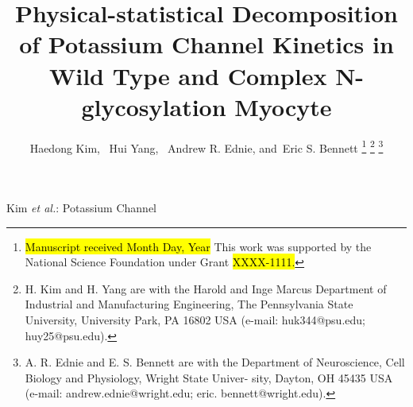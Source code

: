 \documentclass[journal]{IEEEtran}
\begin{document}
    \title{Physical-statistical Decomposition of Potassium Channel Kinetics in Wild Type and Complex N-glycosylation Myocyte}
  \author{Haedong Kim,~
      Hui Yang,~
      Andrew R. Ednie,
      and~Eric S. Bennett
  \thanks{\hl{Manuscript received Month Day, Year} This work was supported by the National Science Foundation under Grant \hl{XXXX-1111.}}
  \thanks{H. Kim and H. Yang are with the Harold and Inge Marcus Department of Industrial and Manufacturing Engineering, The Pennsylvania State University, University Park, PA 16802 USA (e-mail: huk344@psu.edu; huy25@psu.edu).}%
  \thanks{A. R. Ednie and E. S. Bennett are with the Department of Neuroscience, Cell Biology and Physiology, Wright State Univer- sity, Dayton, OH 45435 USA (e-mail: andrew.ednie@wright.edu; eric. bennett@wright.edu).}}

%
{Kim \MakeLowercase{\textit{et al.}}: Potassium Channel}


\maketitle
\end{document}
